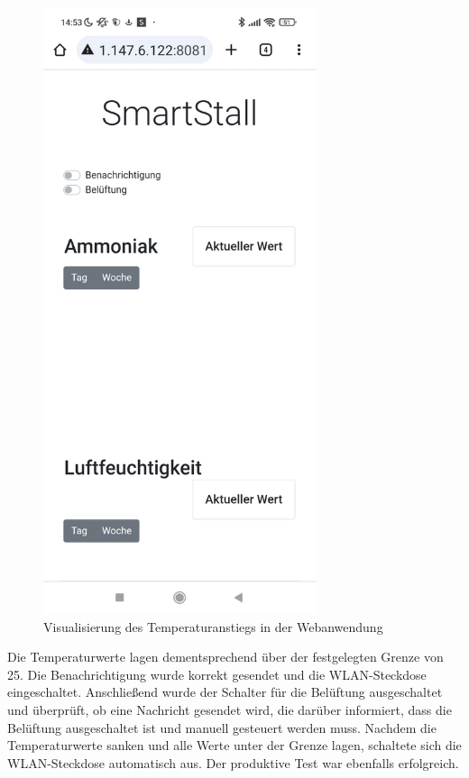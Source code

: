 \documentclass[conference]{IEEEtran}
\begin{document}
\begin{figure}[H]
	\centering
	\includegraphics[width=80mm]{fig/anstiegTemperatur.jpg}
	\caption{Visualisierung des Temperaturanstiegs in der Webanwendung}
	\label{webanwendungtest}
\end{figure}

Die Temperaturwerte lagen dementsprechend über der festgelegten Grenze von 25. Die Benachrichtigung wurde korrekt gesendet und die WLAN-Steckdose eingeschaltet. Anschließend wurde der Schalter für die Belüftung ausgeschaltet und überprüft, ob eine Nachricht gesendet wird, die darüber informiert, dass die Belüftung ausgeschaltet ist und manuell gesteuert werden muss. Nachdem die Temperaturwerte sanken und alle Werte unter der Grenze lagen, schaltete sich die WLAN-Steckdose automatisch aus. Der produktive Test war ebenfalls erfolgreich.
\end{document}
